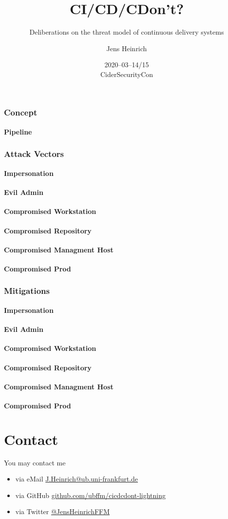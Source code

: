\documentclass{beamer}
\title{CI/CD/CDon't?}
\subtitle{Deliberations on the threat model of continuous delivery systems}
\date[CiderSecurityCon]{2020--03--14/15\\CiderSecurityCon}
\institute[UBFFM]{\href{https://www.ub.uni-frankfurt.de}{Universit\"atsbibliothek Johann Christian Senckenberg}}
\author[J
	{\includegraphics[
		keepaspectratio,
		height=4pt
		]
		{icon.png}
		}
		]{Jens Heinrich}
\begin{document}
\begin{frame}
	\titlepage
\end{frame}

\begin{frame}
	\frametitle<1-1>{Concept}
	\framesubtitle<1-1>{Pipeline}
	\frametitle<2-7>{Attack Vectors}
	\framesubtitle<2-2>{Impersonation}
	\framesubtitle<3-3>{Evil Admin}
	\framesubtitle<4-4>{Compromised Workstation}
	\framesubtitle<5-5>{Compromised Repository}
	\framesubtitle<6-6>{Compromised Managment Host}
	\framesubtitle<7-7>{Compromised Prod}
	\frametitle<8-13>{Mitigations}
	\framesubtitle<8-8>{Impersonation}
	\framesubtitle<9-9>{Evil Admin}
	\framesubtitle<10-10>{Compromised Workstation}
	\framesubtitle<11-11>{Compromised Repository}
	\framesubtitle<12-12>{Compromised Managment Host}
	\framesubtitle<13-13>{Compromised Prod}
	
\end{frame}

\section{Contact}
\begin{frame}
	You may contact me
	\begin{itemize}
		\item via eMail \href{mailto://J.Heinrich@ub.uni-frankfurt.de}{\url{J.Heinrich@ub.uni-frankfurt.de}} \\
		\item via GitHub \href{https://github.com/ubffm/cicdcdont-lightning}{\url{github.com/ubffm/cicdcdont-lightning}} \\
		\item via Twitter \href{https://twitter.com/JensHeinrichFFM}{@JensHeinrichFFM}
	\end{itemize}
\end{frame}
\end{document}
